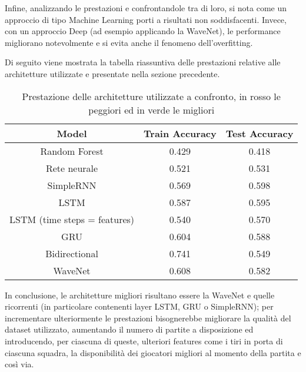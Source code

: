 Infine, analizzando le prestazioni e confrontandole tra di loro, si nota come un approccio di tipo Machine Learning porti a risultati non soddisfacenti. Invece, con un approccio Deep (ad esempio applicando la WaveNet), le performance migliorano notevolmente e si evita anche il fenomeno dell'overfitting. 

Di seguito viene mostrata la tabella riassuntiva delle prestazioni relative alle architetture utilizzate e presentate nella sezione precedente.
\begin{table}[h]
    \centering
    \begin{tabular}{|c|c|c|}
    \hline
         \textbf{Model} & \textbf{Train Accuracy} & \textbf{Test Accuracy} \\
    \hline 
        \rowcolor{maroon!70} Random Forest & 0.429 &  0.418 \\
    \hline
        Rete neurale & 0.521 & 0.531 \\
    \hline
        \rowcolor{gre!50} SimpleRNN & 0.569 & 0.598 \\
    \hline
        \rowcolor{gre!50} LSTM & 0.587 & 0.595 \\
    \hline
        LSTM (time steps = features) & 0.540 & 0.570 \\
    \hline
        GRU & 0.604 & 0.588 \\
    \hline
        \rowcolor{maroon!70} Bidirectional & 0.741 & 0.549 \\
    \hline
        WaveNet & 0.608 & 0.582 \\
    \hline
    \end{tabular}
    \caption{Prestazione delle architetture utilizzate a confronto, in rosso le peggiori ed in verde le migliori}
    \label{tab:prestazioni}
\end{table}

In conclusione, le architetture migliori risultano essere la WaveNet e quelle ricorrenti (in particolare contenenti layer LSTM, GRU o SimpleRNN); per incrementare ulteriormente le prestazioni bisognerebbe migliorare la qualità del dataset utilizzato, aumentando il numero di partite a disposizione ed introducendo, per ciascuna di queste, ulteriori features come i tiri in porta di ciascuna squadra, la disponibilità dei giocatori migliori al momento della partita e così via.